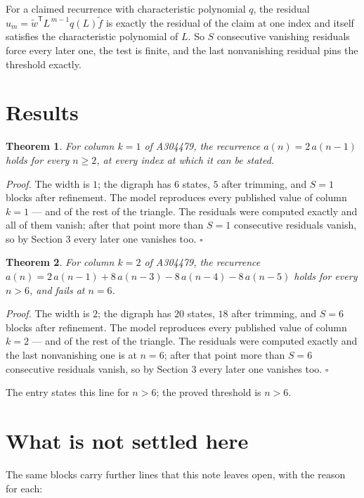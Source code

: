 \documentclass[11pt]{article}
\newtheorem{theorem}{Theorem}
\theoremstyle{definition}
\begin{document}
For a claimed recurrence with characteristic polynomial $q$, the residual $u_m = \tilde w^{\mathsf T}L^{\,m-1}q(L)\tilde f$ is exactly the residual of the claim at one index and itself satisfies the characteristic polynomial of $L$. So $S$ consecutive vanishing residuals force every later one, the test is finite, and the last nonvanishing residual pins the threshold exactly.

\section{Results}

\begin{theorem} For column $k = 1$ of A304479, the recurrence $a(n) = 2\,a(n-1)$ holds for every $n \ge 2$, at every index at which it can be stated.\end{theorem}

{\itshape Proof.} The width is $1$; the digraph has $6$ states, $5$ after trimming, and $S = 1$ blocks after refinement. The model reproduces every published value of column $k = 1$ --- and of the rest of the triangle. The residuals were computed exactly and all of them vanish; after that point more than $S = 1$ consecutive residuals vanish, so by Section 3 every later one vanishes too. $\square$

\begin{theorem} For column $k = 2$ of A304479, the recurrence $a(n) = 2\,a(n-1) + 8\,a(n-3) - 8\,a(n-4) - 8\,a(n-5)$ holds for every $n > 6$, and fails at $n = 6$.\end{theorem}

{\itshape Proof.} The width is $2$; the digraph has $20$ states, $18$ after trimming, and $S = 6$ blocks after refinement. The model reproduces every published value of column $k = 2$ --- and of the rest of the triangle. The residuals were computed exactly and the last nonvanishing one is at $n = 6$; after that point more than $S = 6$ consecutive residuals vanish, so by Section 3 every later one vanishes too. $\square$

The entry states this line for $n > 6$; the proved threshold is $n > 6$.

\section{What is not settled here}

The same blocks carry further lines that this note leaves open, with the reason for each:
\end{document}
